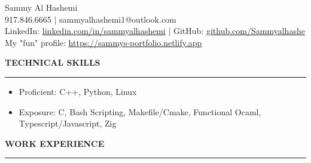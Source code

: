 \documentclass[12pt]{article}
\newcommand{\sectionRule}{\textcolor{gray}{\rule{7.27in}{0.02cm}}}
\newcommand{\sectionTxt}[1]{\noindent\textbf{#1}\\}
\begin{document}
    \begin{center}
        {\huge Sammy Al Hashemi}\\
        {\normalsize 917.846.6665 $|$ sammyalhashemi1@outlook.com}\\
        {\normalsize LinkedIn: \href{https://www.linkedin.com/in/sammyalhashemi}{linkedin.com/in/sammyalhashemi} $|$ GitHub: \href{https://github.com/Sammyalhashe}{github.com/Sammyalhashe}}\\
        {\normalsize My "fun" profile: \href{https://sammys-portfolio.netlify.app}{https://sammys-portfolio.netlify.app}}\\
    \end{center}
    \sectionTxt{TECHNICAL SKILLS}
    \sectionRule
    \begin{small}
        \begin{itemize}
            \itemsep0em 
            \item Proficient: {\color{textGray}C++, Python, Linux}
            \item Exposure: {\color{textGray}C, Bash Scripting, Makefile/Cmake, Functional Ocaml, Typescript/Javascript, Zig}
        \end{itemize}
    \end{small}
    \sectionTxt{WORK EXPERIENCE}
    \sectionRule
\end{document}
